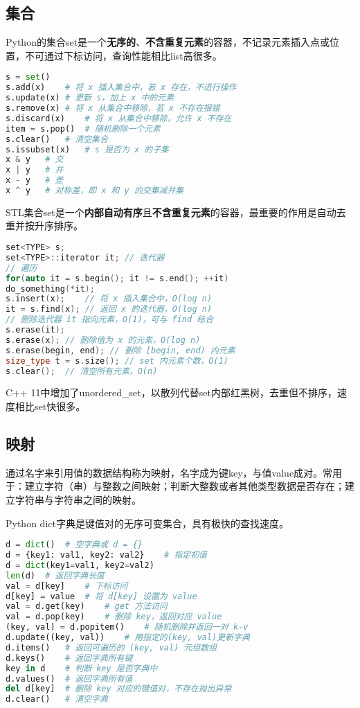 \subsection{集合}

Python的集合set是一个\textbf{无序的}、\textbf{不含重复元素}的容器，不记录元素插入点或位置，不可通过下标访问，查询性能相比list高很多。

\begin{lstlisting}[language=python]
s = set()
s.add(x)	# 将 x 插入集合中，若 x 存在，不进行操作
s.update(x)	# 更新 s，加上 x 中的元素
s.remove(x)	# 将 x 从集合中移除，若 x 不存在报错
s.discard(x)	# 将 x 从集合中移除，允许 x 不存在
item = s.pop()	# 随机删除一个元素
s.clear()	# 清空集合
s.issubset(x)	# s 是否为 x 的子集
x & y	# 交
x | y	# 并
x - y	# 差
x ^ y	# 对称差，即 x 和 y 的交集减并集
\end{lstlisting}

STL集合set是一个\textbf{内部自动有序}且\textbf{不含重复元素}的容器，最重要的作用是自动去重并按升序排序。

\begin{lstlisting}[language=c++]
set<TYPE> s;
set<TYPE>::iterator it;	// 迭代器
// 遍历
for(auto it = s.begin(); it != s.end(); ++it)
do_something(*it);
s.insert(x);	// 将 x 插入集合中，O(log n)
it = s.find(x);	// 返回 x 的迭代器，O(log n)
// 删除迭代器 it 指向元素，O(1)，可与 find 结合
s.erase(it);
s.erase(x);	// 删除值为 x 的元素，O(log n)
s.erase(begin, end); // 删除 [begin, end) 内元素
size_type t = s.size();	// set 内元素个数，O(1) 
s.clear();	// 清空所有元素，O(n)
\end{lstlisting}

C++ 11中增加了unordered\_set，以散列代替set内部红黑树，去重但不排序，速度相比set快很多。

\subsection{映射}

通过名字来引用值的数据结构称为映射，名字成为键key，与值value成对。常用于：建立字符（串）与整数之间映射；判断大整数或者其他类型数据是否存在；建立字符串与字符串之间的映射。

Python dict字典是键值对的无序可变集合，具有极快的查找速度。

\begin{lstlisting}[language=python]
d = dict()	# 空字典或 d = {}
d = {key1: val1, key2: val2}	# 指定初值
d = dict(key1=val1, key2=val2)
len(d)	# 返回字典长度
val = d[key]	# 下标访问
d[key] = value	# 将 d[key] 设置为 value
val = d.get(key)	# get 方法访问
val = d.pop(key)	# 删除 key，返回对应 value
(key, val) = d.popitem()	# 随机删除并返回一对 k-v
d.update((key, val))	# 用指定的(key, val)更新字典
d.items()	# 返回可遍历的 (key, val) 元组数组
d.keys()	# 返回字典所有键
key in d	# 判断 key 是否字典中
d.values()	# 返回字典所有值
del d[key]	# 删除 key 对应的键值对，不存在抛出异常
d.clear()	# 清空字典
\end{lstlisting}

